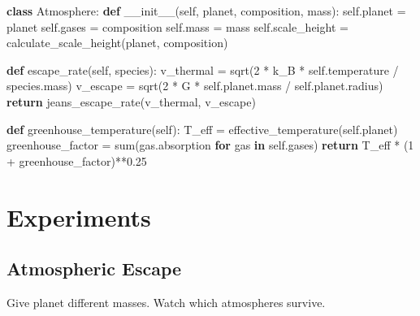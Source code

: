 \documentclass[
  11pt,
  letterpaper,
  twoside,
  openright]{book}
\newenvironment{Shaded}{\begin{snugshade}}{\end{snugshade}}
\newcommand{\BuiltInTok}[1]{\textcolor[rgb]{0.00,0.23,0.31}{#1}}
\newcommand{\ControlFlowTok}[1]{\textcolor[rgb]{0.00,0.23,0.31}{\textbf{#1}}}
\newcommand{\DecValTok}[1]{\textcolor[rgb]{0.68,0.00,0.00}{#1}}
\newcommand{\FloatTok}[1]{\textcolor[rgb]{0.68,0.00,0.00}{#1}}
\newcommand{\FunctionTok}[1]{\textcolor[rgb]{0.28,0.35,0.67}{#1}}
\newcommand{\KeywordTok}[1]{\textcolor[rgb]{0.00,0.23,0.31}{\textbf{#1}}}
\newcommand{\NormalTok}[1]{\textcolor[rgb]{0.00,0.23,0.31}{#1}}
\newcommand{\OperatorTok}[1]{\textcolor[rgb]{0.37,0.37,0.37}{#1}}
\newcommand{\VariableTok}[1]{\textcolor[rgb]{0.07,0.07,0.07}{#1}}
\begin{document}
\begin{Shaded}
\begin{Highlighting}[]
\KeywordTok{class}\NormalTok{ Atmosphere:}
    \KeywordTok{def} \FunctionTok{\_\_init\_\_}\NormalTok{(}\VariableTok{self}\NormalTok{, planet, composition, mass):}
        \VariableTok{self}\NormalTok{.planet }\OperatorTok{=}\NormalTok{ planet}
        \VariableTok{self}\NormalTok{.gases }\OperatorTok{=}\NormalTok{ composition}
        \VariableTok{self}\NormalTok{.mass }\OperatorTok{=}\NormalTok{ mass}
        \VariableTok{self}\NormalTok{.scale\_height }\OperatorTok{=}\NormalTok{ calculate\_scale\_height(planet, composition)}

    \KeywordTok{def}\NormalTok{ escape\_rate(}\VariableTok{self}\NormalTok{, species):}
\NormalTok{        v\_thermal }\OperatorTok{=}\NormalTok{ sqrt(}\DecValTok{2} \OperatorTok{*}\NormalTok{ k\_B }\OperatorTok{*} \VariableTok{self}\NormalTok{.temperature }\OperatorTok{/}\NormalTok{ species.mass)}
\NormalTok{        v\_escape }\OperatorTok{=}\NormalTok{ sqrt(}\DecValTok{2} \OperatorTok{*}\NormalTok{ G }\OperatorTok{*} \VariableTok{self}\NormalTok{.planet.mass }\OperatorTok{/} \VariableTok{self}\NormalTok{.planet.radius)}
        \ControlFlowTok{return}\NormalTok{ jeans\_escape\_rate(v\_thermal, v\_escape)}

    \KeywordTok{def}\NormalTok{ greenhouse\_temperature(}\VariableTok{self}\NormalTok{):}
\NormalTok{        T\_eff }\OperatorTok{=}\NormalTok{ effective\_temperature(}\VariableTok{self}\NormalTok{.planet)}
\NormalTok{        greenhouse\_factor }\OperatorTok{=} \BuiltInTok{sum}\NormalTok{(gas.absorption }\ControlFlowTok{for}\NormalTok{ gas }\KeywordTok{in} \VariableTok{self}\NormalTok{.gases)}
        \ControlFlowTok{return}\NormalTok{ T\_eff }\OperatorTok{*}\NormalTok{ (}\DecValTok{1} \OperatorTok{+}\NormalTok{ greenhouse\_factor)}\OperatorTok{**}\FloatTok{0.25}
\end{Highlighting}
\end{Shaded}

\section{Experiments}\label{experiments-16}

\subsection{Atmospheric Escape}\label{atmospheric-escape-1}

Give planet different masses. Watch which atmospheres survive.
\end{document}
